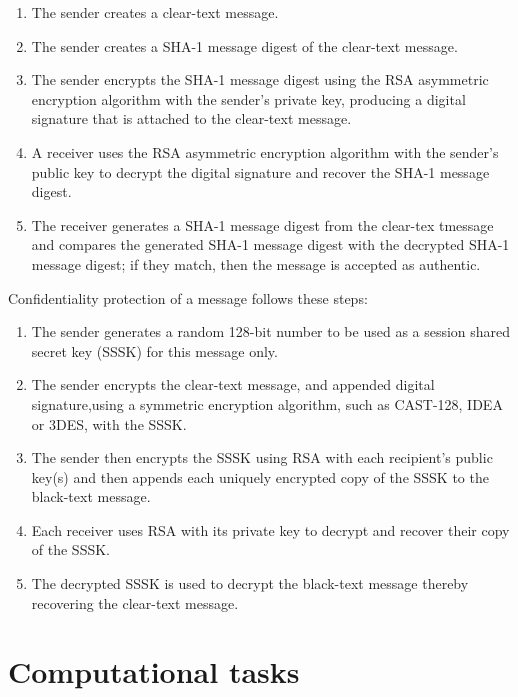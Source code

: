 \documentclass[12pt, a4paper]{report}
\begin{document}
	\begin{enumerate}
	
		\item The sender creates a clear-text message.
		
		\item The sender creates a SHA-1 message digest of the clear-text message.
		
		\item The sender encrypts the SHA-1 message digest using the RSA asymmetric encryption algorithm with the sender’s private key, producing a digital signature that is attached to the clear-text message.
		
		\item A receiver uses the RSA asymmetric encryption algorithm with the sender's public key to decrypt the digital signature and recover the SHA-1 message digest.
		
		\item The receiver generates a SHA-1 message digest from the clear-tex tmessage and compares the generated SHA-1 message digest with the decrypted SHA-1 message digest; if they match, then the message is accepted as authentic.
	
	
	\end{enumerate}
	
Confidentiality protection of a message follows these steps:

	\begin{enumerate}
		\item The sender generates a random 128-bit number to be used as a session shared secret key (SSSK) for this message only.
		\item The sender encrypts the clear-text message, and appended digital signature,using a symmetric encryption algorithm, such as CAST-128, IDEA or 3DES, with the SSSK.
		\item The sender then encrypts the SSSK using RSA with each recipient’s public key(s) and then appends each uniquely encrypted copy of the SSSK to the black-text message.
		\item Each receiver uses RSA with its private key to decrypt and recover their copy of the SSSK.
		\item The decrypted SSSK is used to decrypt the black-text message thereby recovering the clear-text message.
	\end{enumerate}
\section{Computational tasks}
\end{document}
